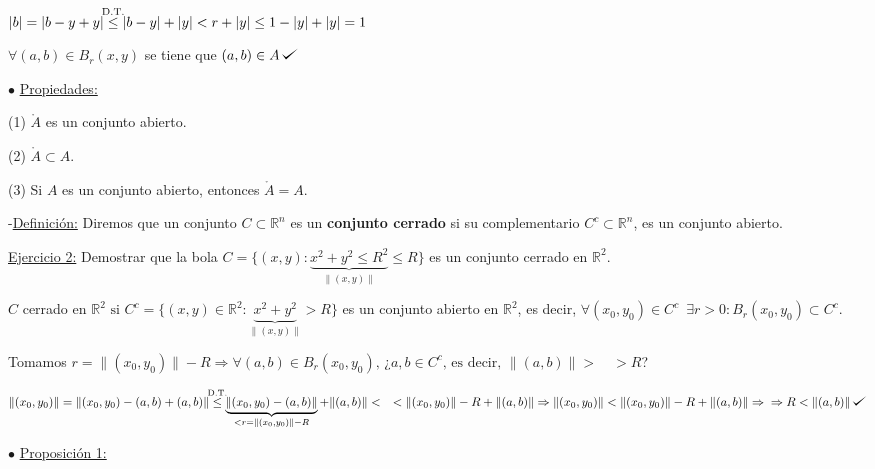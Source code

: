 \documentclass[12pt, titlepage]{article}
\def\checkmark{\tikz\fill[scale=0.4](0,.35) -- (.25,0) -- (1,.7) -- (.25,.15) -- cycle;}
\newcommand{\leqc}[1]{\stackrel{\mathclap{\normalfont\mbox{\scriptsize{#1}}}}{\leq}}
\newcommand{\R}{\mathbb{R}}
\newcommand{\spac}{\, \, \,}
\begin{document}
$|b| = |b - y + y| \leqc{D.T.} |b - y| +|y| < r + |y| \leq 1 - |y| + |y| = 1$
\vspace{3mm}

$\forall (a, b) \in B_r(x, y)$ se tiene que $(a, b) \in A \, \checkmark$
\vspace{5mm}


\noindent$\bullet$ \underline{Propiedades:}
\vspace{3mm}

(1) $\mathring{A}$ es un conjunto abierto.
\vspace{3mm}

(2) $\mathring{A} \subset A$.
\vspace{3mm}

(3) Si $A$ es un conjunto abierto, entonces $\mathring{A} = A$.
\vspace{5mm}

\noindent-\underline{Definición:} Diremos que un conjunto $C \subset \R^n$ es un \textbf{conjunto
 cerrado} si su complementario $C^c \subset \R^n$, es un conjunto abierto.
\vspace{3mm}

\underline{Ejercicio 2:} Demostrar que la bola $C = \{ (x, y) : \underbrace{x^2 + y^2 \leq R^2}_{\|(x, y
)\|} \leq R\}$ es un conjunto cerrado en $\R^2$.
\vspace{3mm}

$C$  cerrado en $\R^2 \text{ si } C^c = \{(x, y) \in \R^2 : \underbrace{x^2 + y^2}_{\|(x, y)\|} > R\}$ es
 un conjunto abierto en $\R^2$, es decir, $\forall (x_0, y_0) \in C^c \spac \exists r > 0 : B_r (x_0, y_0)
 \subset C^c$.
\vspace{3mm}

Tomamos $r = \| (x_0, y_0) \| - R \Rightarrow \forall (a, b) \in B_r (x_0, y_0) \text{, ¿} a, b \in C^c \text{,
 es decir, } \| (a, b) \| > \quad > R$?
\vspace{2mm}

$\| (x_0, y_0) \| = \| (x_0, y_0) - (a, b) + (a, b) \| \leqc{D.T.} \underbrace{\| (x_0, y_0) - (a, b) \|}_{< r =
 \| (x_0, y_0) \| - R} + \| (a, b) \| < \quad < \| (x_0, y_0) \| - R + \| (a, b) \| \Rightarrow \| (x_0, y_0) \| <
 \| (x_0, y_0) \| - R + \| (a, b) \| \Rightarrow \\ \Rightarrow R < \| (a, b) \| \, \checkmark$
\vspace{5mm}

\noindent$\bullet$ \underline{Proposición 1:}
\vspace{3mm}
\end{document}
